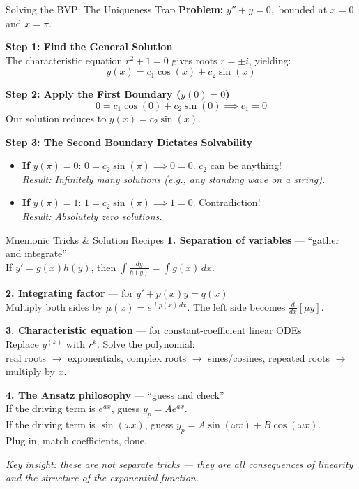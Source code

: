 \begin{frame}{Solving the BVP: The Uniqueness Trap}
\textbf{Problem:} $y'' + y = 0,$ bounded at $x=0$ and $x=\pi.$

\textbf{Step 1: Find the General Solution} \\
The characteristic equation $r^2 + 1 = 0$ gives roots $r = \pm i$, yielding:
$$y(x) = c_1 \cos(x) + c_2 \sin(x)$$

\textbf{Step 2: Apply the First Boundary ($y(0) = 0$)}
$$0 = c_1 \cos(0) + c_2 \sin(0) \implies c_1 = 0$$
Our solution reduces to $y(x) = c_2 \sin(x)$.

\textbf{Step 3: The Second Boundary Dictates Solvability}
\begin{itemize}
    \item \textbf{If} $y(\pi) = 0$: $0 = c_2 \sin(\pi) \implies 0 = 0$. $c_2$ can be anything! \\ \textit{Result: Infinitely many solutions (e.g., any standing wave on a string).}
    \item \textbf{If} $y(\pi) = 1$: $1 = c_2 \sin(\pi) \implies 1 = 0$. Contradiction! \\ \textit{Result: Absolutely zero solutions.}
\end{itemize}
\end{frame}


\begin{frame}{Mnemonic Tricks \& Solution Recipes}
\textbf{1. Separation of variables} --- ``gather and integrate'' \\
If $y' = g(x)h(y)$, then $\displaystyle\int \frac{dy}{h(y)} = \int g(x)\,dx$.

\vspace{0.3cm}
\textbf{2. Integrating factor} --- for $y' + p(x)y = q(x)$ \\
Multiply both sides by $\mu(x) = e^{\int p(x)\,dx}$. The left side becomes $\frac{d}{dx}[\mu y]$.

\vspace{0.3cm}
\textbf{3. Characteristic equation} --- for constant-coefficient linear ODEs \\
Replace $y^{(k)}$ with $r^k$. Solve the polynomial: \\
\quad real roots $\to$ exponentials, \quad complex roots $\to$ sines/cosines, \quad repeated roots $\to$ multiply by $x$.

\vspace{0.3cm}
\textbf{4. The Ansatz philosophy} --- ``guess and check'' \\
If the driving term is $e^{ax}$, guess $y_p = Ae^{ax}$. \\
If the driving term is $\sin(\omega x)$, guess $y_p = A\sin(\omega x) + B\cos(\omega x)$. \\
Plug in, match coefficients, done.

\vspace{0.3cm}
\textit{Key insight: these are not separate tricks --- they are all consequences of linearity and the structure of the exponential function.}
\end{frame}
